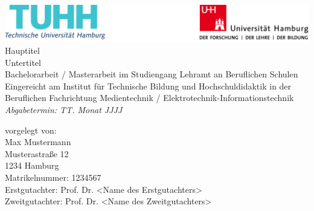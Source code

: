 \begin{titlepage}
  \begin{center}
  \sffamily
    \vfill
    \vspace*{-1.5cm}
    \includegraphics{source/img/headerLogos.png}
    \vfill
    \vspace*{1.5cm}
    {\Large Hauptitel }\\ %
    \vspace*{-1.2cm}
    \vfill
    {\large Untertitel}\\ %
    \vfill
    {\normalsize Bachelorarbeit / Masterarbeit im Studiengang Lehramt an Beruflichen Schulen
        Eingereicht am Institut für Technische Bildung und Hochschuldidaktik
        in der Beruflichen Fachrichtung Medientechnik /
        Elektrotechnik-Informationstechnik
    }
    \vfill
    \textit{Abgabetermin: TT. Monat JJJJ}
  \end{center}
  \vfill
  vorgelegt von:\\
  Max Mustermann \\
  Musterastraße 12 \\
  1234 Hamburg \\
  Matrikelnummer: 1234567\\[2mm]
  \vfill
  Erstgutachter: Prof. Dr. <Name des Erstgutachters> \\ 			%
  Zweitgutachter: Prof. Dr. <Name des Zweitgutachters>				%
\end{titlepage}
